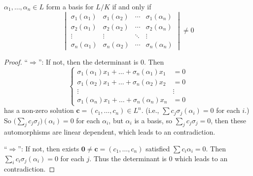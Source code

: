 \begin{lemma} \label{lemma:basis-iff-det-neq-0}
  $\alpha_1, \dots, \alpha_n \in L$ form a basis for $L/K$ if and only if
  \[
    \begin{vmatrix}
      \sigma_1(\alpha_1) & \sigma_1(\alpha_2) & \cdots & \sigma_1(\alpha_n) \\
      \sigma_2(\alpha_1) & \sigma_2(\alpha_2) & \cdots & \sigma_2(\alpha_n) \\
      \vdots & \vdots & \ddots & \vdots \\
      \sigma_n(\alpha_1) & \sigma_n(\alpha_2) & \cdots & \sigma_n(\alpha_n)
    \end{vmatrix} \neq 0
  \]

  \begin{proof}
    ``$\Rightarrow$'': If not, then the determinant is $0$. Then
    \[ \left\{
          \begin{array}{cr}
          \sigma_1(\alpha_1) x_1 + \dots + \sigma_n(\alpha_1) x_1 &= 0 \\
          \sigma_1(\alpha_2) x_1 + \dots + \sigma_n(\alpha_2) x_2 &= 0 \\
          \vdots & \vdots \\
          \sigma_1(\alpha_n) x_1 + \dots + \sigma_n(\alpha_n) x_n &= 0
        \end{array}
      \right.
    \]
    has a non-zero solution $\bm{c} = (c_1, \dots, c_n) \in L^n$. (i.e., $\sum c_j \sigma_j(\alpha_i) = 0$
    for each $i$.) So $\big( \sum_{j} c_j \sigma_j \big)(\alpha_i) = 0$ for each $\alpha_i$,
    but $\alpha_i$ is a basis, so $\sum_{j} c_j \sigma_j = 0$, then these automorphisms
    are linear dependent, which leads to an contradiction.

    ``$\Rightarrow$'': If not, then exists $\bm{0} \neq \bm{c} = (c_1, \dots, c_n)$
    satisfied $\sum c_i \alpha_i = 0$. Then $\sum_i c_i \sigma_j(\alpha_i) = 0$
    for each $j$. Thus the determinant is $0$ which leads to an contradiction.
  \end{proof}
\end{lemma}

